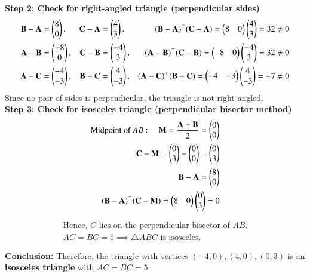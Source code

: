 \documentclass[journal]{IEEEtran}
\begin{document}
\textbf{Step 2: Check for right-angled triangle (perpendicular sides)}
\begin{align}
\mathbf{B}-\mathbf{A} &= \begin{pmatrix}8\\0\end{pmatrix}, &
\mathbf{C}-\mathbf{A} &= \begin{pmatrix}4\\3\end{pmatrix}, &
(\mathbf{B}-\mathbf{A})^\top (\mathbf{C}-\mathbf{A}) = \begin{pmatrix}8&0\end{pmatrix}\begin{pmatrix}4\\3\end{pmatrix} = 32 \neq 0 \\
\mathbf{A}-\mathbf{B} &= \begin{pmatrix}-8\\0\end{pmatrix}, &
\mathbf{C}-\mathbf{B} &= \begin{pmatrix}-4\\3\end{pmatrix}, &
(\mathbf{A}-\mathbf{B})^\top (\mathbf{C}-\mathbf{B}) = \begin{pmatrix}-8&0\end{pmatrix}\begin{pmatrix}-4\\3\end{pmatrix} = 32 \neq 0 \\
\mathbf{A}-\mathbf{C} &= \begin{pmatrix}-4\\-3\end{pmatrix}, &
\mathbf{B}-\mathbf{C} &= \begin{pmatrix}4\\-3\end{pmatrix}, &
(\mathbf{A}-\mathbf{C})^\top (\mathbf{B}-\mathbf{C}) = \begin{pmatrix}-4&-3\end{pmatrix}\begin{pmatrix}4\\-3\end{pmatrix} = -7 \neq 0
\end{align}
Since no pair of sides is perpendicular, the triangle is not right-angled.\\
\textbf{Step 3: Check for isosceles triangle (perpendicular bisector method)}
\begin{align}
\text{Midpoint of } AB: \quad \mathbf{M} = \frac{\mathbf{A}+\mathbf{B}}{2} = \begin{pmatrix}0\\0\end{pmatrix} \\
\mathbf{C}-\mathbf{M} = \begin{pmatrix}0\\3\end{pmatrix}-\begin{pmatrix}0\\0\end{pmatrix} = \begin{pmatrix}0\\3\end{pmatrix} \\
\mathbf{B}-\mathbf{A} = \begin{pmatrix}8\\0\end{pmatrix} \\
(\mathbf{B}-\mathbf{A})^\top (\mathbf{C}-\mathbf{M}) = \begin{pmatrix}8&0\end{pmatrix}\begin{pmatrix}0\\3\end{pmatrix} = 0
\end{align}


\begin{align*}
\text{Hence, } C \text{ lies on the perpendicular bisector of } AB.\\
AC = BC = 5 \implies \triangle ABC \text{ is isosceles.}
\end{align*}


\textbf{Conclusion:} Therefore, the triangle with vertices $(-4,0), (4,0), (0,3)$ is an \textbf{isosceles triangle} with $AC = BC = 5$.
\end{document}
